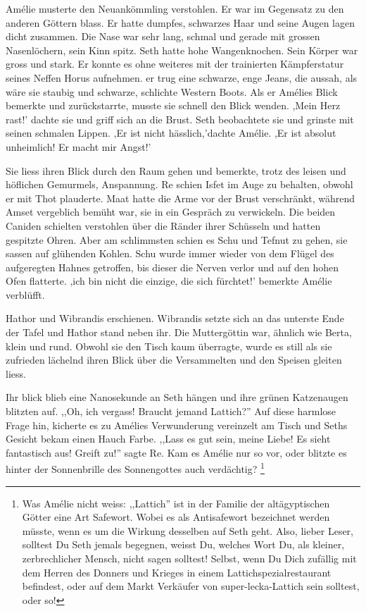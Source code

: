 \documentclass[11pt,titlepage,a5paper]{book}
\begin{document}
Amélie musterte den Neuankömmling verstohlen. Er war im Gegensatz zu den anderen Göttern blass. Er hatte dumpfes, schwarzes Haar und seine Augen lagen dicht zusammen. Die Nase war sehr lang, schmal und gerade mit grossen Nasenlöchern, sein Kinn spitz. Seth hatte hohe Wangenknochen. Sein Körper war gross und stark. Er konnte es ohne weiteres mit der trainierten Kämpferstatur seines Neffen Horus aufnehmen. er trug eine schwarze, enge Jeans, die aussah, als wäre sie staubig und schwarze, schlichte Western Boots. Als er Amélies Blick bemerkte und zurückstarrte, musste sie schnell den Blick wenden. ,Mein Herz rast!' dachte sie und griff sich an die Brust. Seth beobachtete sie und grinste mit seinen schmalen Lippen. ,Er ist nicht hässlich,'dachte Amélie. ,Er ist absolut unheimlich! Er macht mir Angst!' 

 Sie liess ihren Blick durch den Raum gehen und bemerkte, trotz des leisen und höflichen Gemurmels, Anspannung. Re schien Isfet im Auge zu behalten, obwohl er mit Thot plauderte. Maat hatte die Arme vor der Brust verschränkt, während Amset vergeblich bemüht war, sie in ein Gespräch zu verwickeln. Die beiden Caniden schielten verstohlen über die Ränder ihrer Schüsseln und hatten gespitzte Ohren. Aber am schlimmsten schien es Schu und Tefnut zu gehen, sie sassen auf glühenden Kohlen. Schu wurde immer wieder von dem Flügel des aufgeregten Hahnes getroffen, bis dieser die Nerven verlor und auf den hohen Ofen flatterte. ,ich bin nicht die einzige, die sich fürchtet!' bemerkte Amélie verblüfft.

Hathor und Wibrandis erschienen. Wibrandis setzte sich an das unterste Ende der Tafel und Hathor stand neben ihr. Die Muttergöttin war, ähnlich wie Berta, klein und rund. Obwohl sie den Tisch kaum überragte, wurde es still als sie zufrieden lächelnd ihren Blick über die Versammelten und den Speisen gleiten liess.

 Ihr blick blieb eine Nanosekunde an Seth hängen und ihre grünen Katzenaugen blitzten auf. ,,Oh, ich vergass! Braucht jemand Lattich?'' Auf diese harmlose Frage hin, kicherte es zu Amélies Verwunderung vereinzelt am Tisch und Seths Gesicht bekam einen Hauch Farbe. ,,Lass es gut sein, meine Liebe! Es sieht fantastisch aus! Greift zu!'' sagte Re. Kam es Amélie nur so vor, oder blitzte es hinter der Sonnenbrille des Sonnengottes auch verdächtig? \footnote{Was Amélie nicht weiss: ,,Lattich'' ist in der Familie der altägyptischen Götter eine Art Safewort. Wobei es als Antisafewort bezeichnet werden müsste, wenn es um die Wirkung desselben auf Seth geht. Also, lieber Leser, solltest Du Seth jemals begegnen, weisst Du, welches Wort Du, als kleiner, zerbrechlicher Mensch, nicht sagen solltest! Selbst, wenn Du Dich zufällig mit dem Herren des Donners und Krieges in einem Lattichspezialrestaurant befindest, oder auf dem Markt Verkäufer von super-lecka-Lattich  sein solltest, oder so!} 
\end{document}
